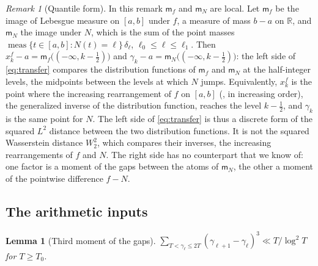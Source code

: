 \documentclass[11pt,a4paper]{article}
\makeatletter
\numberwithin{equation}{section}
\DeclareRobustCommand{\CGeqref}[1]{\eqref{#1}}
\DeclareRobustCommand{\CGcite}[2][]{\if\relax\detokenize{#1}\relax\cite{#2}\else\cite[#1]{#2}\fi}
\let\CG@origeqref\eqref
\newcommand{\CG@gettip}[1]{\@ifundefined{CGTip@#1}{#1}{\csname CGTip@#1\endcsname}}
\newcommand{\CG@getbib}[1]{\@ifundefined{CGBib@#1}{#1}{\csname CGBib@#1\endcsname}}
\DeclareRobustCommand{\CGeqref}[1]{\pdftooltip{\CG@origeqref{#1}}{\CG@gettip{#1}}}
\DeclareRobustCommand{\CGcite}[2][]{\pdftooltip{\if\relax\detokenize{#1}\relax\cite{#2}\else\cite[#1]{#2}\fi}{\CG@getbib{#2}}}
\newtheorem{lemma}[theorem]{Lemma}
\theoremstyle{definition}
\theoremstyle{remark}
\newtheorem{remark}[theorem]{Remark}
\newcommand{\meas}{\operatorname{meas}}
\newcommand{\R}{\mathbb R}
\makeatother
\begin{document}
\begin{remark}[Quantile form]\label{rem:quantile}
In this remark $\mathsf m_f$ and $\mathsf m_N$ are local. Let $\mathsf m_f$ be the image of Lebesgue measure on $[a,b]$ under $f$, a measure of mass $b-a$ on $\R$, and $\mathsf m_N$ the image under $N$, which is the sum of the point masses $\meas\{t\in[a,b]:N(t)=\ell\}\,\delta_\ell$, $\ell_0\le\ell\le\ell_1$. Then $x^f_k-a=\mathsf m_f\bigl((-\infty,k-\tfrac12)\bigr)$ and $\gamma_k-a=\mathsf m_N\bigl((-\infty,k-\tfrac12)\bigr)$: the left side of \CGeqref{eq:transfer} compares the distribution functions of $\mathsf m_f$ and $\mathsf m_N$ at the half-integer levels, the midpoints between the levels at which $N$ jumps. Equivalently, $x^f_k$ is the point where the increasing rearrangement of $f$ on $[a,b]$ (\CGcite[\S10.12]{HardyLittlewoodPolya1934}, in increasing order), the generalized inverse of the distribution function, reaches the level $k-\frac12$, and $\gamma_k$ is the same point for $N$. The left side of \CGeqref{eq:transfer} is thus a discrete form of the squared $L^2$ distance between the two distribution functions. It is not the squared Wasserstein distance $W_2^2$, which compares their inverses, the increasing rearrangements of $f$ and $N$. The right side has no counterpart that we know of: one factor is a moment of the gaps between the atoms of $\mathsf m_N$, the other a moment of the pointwise difference $f-N$.
\end{remark}

\subsection{The arithmetic inputs}\label{subsec:arith_inputs}

\begin{lemma}[Third moment of the gaps]\label{lem:gaps}
$\sum_{T<\gamma_\ell\le2T}(\gamma_{\ell+1}-\gamma_\ell)^3\ll T/\log^2T$ for $T\ge T_0$.
\end{lemma}
\end{document}

